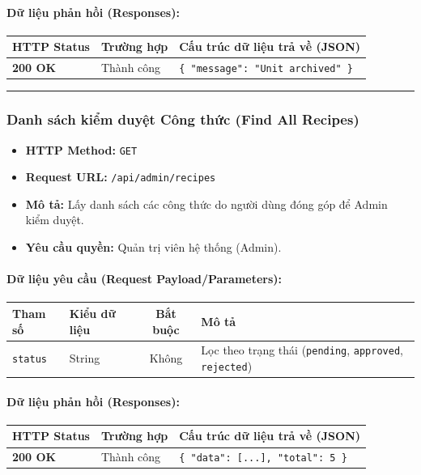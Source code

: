\documentclass[12pt,a4paper]{article}
\begin{document}
\paragraph{Dữ liệu phản hồi (Responses):}
\begin{longtable}{|p{2.8cm}|p{3.2cm}|p{8.0cm}|}
\hline
\textbf{HTTP Status} & \textbf{Trường hợp} & \textbf{Cấu trúc dữ liệu trả về (JSON)} \\ \hline
\endhead
\textbf{200 OK} & Thành công & \texttt{\{ "message": "Unit archived" \}} \\ \hline
\end{longtable}

\vskip 0.4cm
\noindent\rule{\textwidth}{0.3pt}
\vskip 0.4cm

\subsubsection{Danh sách kiểm duyệt Công thức (Find All Recipes)}
\begin{itemize}[leftmargin=*]
    \item \textbf{HTTP Method:} \texttt{GET}
    \item \textbf{Request URL:} \texttt{/api/admin/recipes}
    \item \textbf{Mô tả:} Lấy danh sách các công thức do người dùng đóng góp để Admin kiểm duyệt.
    \item \textbf{Yêu cầu quyền:} Quản trị viên hệ thống (Admin).
\end{itemize}

\paragraph{Dữ liệu yêu cầu (Request Payload/Parameters):}
\begin{longtable}{|p{2.8cm}|p{2.2cm}|c|p{7.0cm}|}
\hline
\textbf{Tham số} & \textbf{Kiểu dữ liệu} & \textbf{Bắt buộc} & \textbf{Mô tả} \\ \hline
\endhead
\texttt{status} & String & Không & Lọc theo trạng thái (\texttt{pending}, \texttt{approved}, \texttt{rejected}) \\ \hline
\end{longtable}

\paragraph{Dữ liệu phản hồi (Responses):}
\begin{longtable}{|p{2.8cm}|p{3.2cm}|p{8.0cm}|}
\hline
\textbf{HTTP Status} & \textbf{Trường hợp} & \textbf{Cấu trúc dữ liệu trả về (JSON)} \\ \hline
\endhead
\textbf{200 OK} & Thành công & \texttt{\{ "data": [...], "total": 5 \}} \\ \hline
\end{longtable}
\end{document}
